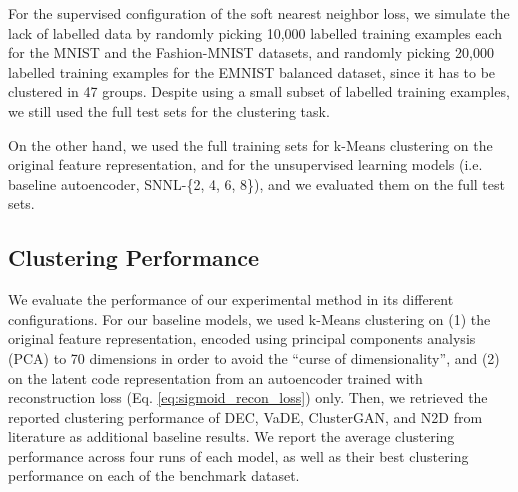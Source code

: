 \documentclass[conference]{IEEEtran}
\begin{document}
For the supervised configuration of the soft nearest neighbor loss, we simulate the lack of labelled data by randomly picking 10,000 labelled training examples each for the MNIST and the Fashion-MNIST datasets, and randomly picking 20,000 labelled training examples for the EMNIST balanced dataset, since it has to be clustered in 47 groups. Despite using a small subset of labelled training examples, we still used the full test sets for the clustering task.

On the other hand, we used the full training sets for k-Means clustering on the original feature representation, and for the unsupervised learning models (i.e. baseline autoencoder, SNNL-\{2, 4, 6, 8\}), and we evaluated them on the full test sets.

\subsection{Clustering Performance}\label{section:clustering_performance}
We evaluate the performance of our experimental method in its different configurations. For our baseline models, we used k-Means clustering on (1) the original feature representation, encoded using principal components analysis (PCA) to 70 dimensions in order to avoid the ``curse of dimensionality''\cite{bellman1961adaptive}, and (2) on the latent code representation from an autoencoder trained with reconstruction loss (Eq. \ref{eq:sigmoid_recon_loss}) only. Then, we retrieved the reported clustering performance of DEC\cite{xie2016unsupervised}, VaDE\cite{jiang2016variational}, ClusterGAN\cite{mukherjee2019clustergan}, and N2D\cite{mcconville2019n2d} from literature as additional baseline results. We report the average clustering performance across four runs of each model, as well as their best clustering performance on each of the benchmark dataset.
\end{document}
